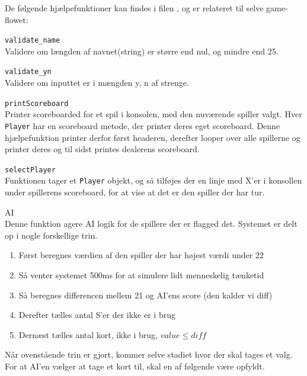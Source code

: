 \documentclass[a4paper]{article}
\begin{document}
      De følgende hjælpefunktioner kan findes i filen , og er relateret til selve game-flowet:
      \begin{description}
        \item{\texttt{validate\_name}}~\\
          Validere om længden af navnet(string) er større end nul,
          og mindre end 25.
      
        \item{\texttt{validate\_yn}}~\\
          Validere om inputtet er i mængden {y, n} af strenge.

        \item{\texttt{printScoreboard}}~\\
          Printer scoreboarded for et spil i konsolen, med den nuværende spiller valgt.
          Hver \texttt{Player} har en scoreboard metode, der printer deres eget scoreboard.
          Denne hjælpefunktion printer derfor først headeren, derefter looper over alle spillerne og printer deres
          og til sidst printes dealerens scoreboard.

        \item{\texttt{selectPlayer}}~\\
          Funktionen tager et \texttt{Player} objekt,
          og så tilføjes der en linje med X'er i konsollen under spillerens scoreboard,
          for at vise at det er den spiller der har tur.

        \item{AI}~\\
          Denne funktion agere AI logik for de spillere der er flagged det.
          Systemet er delt op i nogle forskellige trin.

          \begin{enumerate}
            \item Først beregnes værdien af den spiller der har højest værdi under 22
            \item Så venter systemet 500ms for at simulere lidt menneskelig tænketid
            \item Så beregnes differencen mellem 21 og AI'ens score (den kalder vi diff)
            \item Derefter tælles antal S'er der ikke er i brug
            \item Dernæst tælles antal kort, ikke i brug, $value \leq diff$
          \end{enumerate}

          Når ovenstående trin er gjort, kommer selve stadiet hvor der skal tages et valg.
          For at AI'en vælger at tage et kort til, skal en af følgende være opfyldt.


\end{description}
\end{document}
